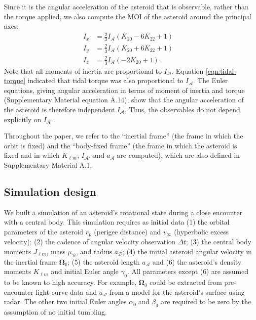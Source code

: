 \documentclass[fleqn,usenatbib]{mnras}
\newcommand{\parens}[1]{\left( #1 \right)}
\begin{document}
Since it is the angular acceleration of the asteroid that is observable, rather than the torque applied, we also compute the MOI of the asteroid around the principal axes: 
\begin{equation}
  \begin{split}
    I_x &= \frac{2}{3} I_\mathcal{A} \parens{K_{20} - 6 K_{22} + 1}\\
    I_y &= \frac{2}{3} I_\mathcal{A} \parens{K_{20} + 6 K_{22} + 1}\\
    I_z &= \frac{2}{3} I_\mathcal{A} \parens{-2K_{20} + 1}.
  \end{split}
  \label{eqn:moi}
\end{equation}
Note that all moments of inertia are proportional to $I_\mathcal{A}$. Equation \ref{eqn:tidal-torque} indicated that tidal torque was also proportional to $I_\mathcal{A}$. The Euler equations, giving angular acceleration in terms of moment of inertia and torque (Supplementary Material equation A.14), show that the angular acceleration of the asteroid is therefore independent $I_\mathcal{A}$. Thus, the observables do not depend explicitly on $I_\mathcal{A}$.

Throughout the paper, we refer to the ``inertial frame'' (the frame in which the orbit is fixed) and the ``body-fixed frame'' (the frame in which the asteroid is fixed and in which $K_{\ell m}$, $I_\mathcal{A}$, and $a_\mathcal{A}$ are computed), which are also defined in Supplementary Material A.1.

\subsection{Simulation design}
\label{sec:sim}

We built a simulation of an asteroid's rotational state during a close encounter with a central body. This simulation requires as initial data (1) the orbital parameters of the asteroid $r_p$ (perigee distance) and $v_\infty$ (hyperbolic excess velocity); (2) the cadence of angular velocity observation $\Delta t$; (3) the central body moments $J_{\ell m}$, mass $\mu_\mathcal{B}$, and radius $a_\mathcal{B}$; (4) the initial asteroid angular velocity in the inertial frame $\bm \Omega_0$; (5) the asteroid length $a_\mathcal{A}$ and (6) the asteroid's density moments $K_{\ell m}$ and initial Euler angle $\gamma_0$. All parameters except (6) are assumed to be known to high accuracy. For example, $\bm \Omega_0$ could be extracted from pre-encounter light-curve data and $a_\mathcal{A}$ from a model for the asteroid's surface using radar. The other two initial Euler angles $\alpha_0$ and $\beta_0$ are required to be zero by the assumption of no initial tumbling.
\end{document}
